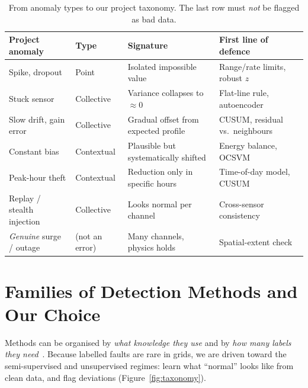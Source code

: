 \documentclass[11pt,a4paper]{article}
\begin{document}
\begin{table}[H]
\centering
\small
\begin{tabularx}{\textwidth}{@{}>{\raggedright\arraybackslash}p{3.1cm}>{\raggedright\arraybackslash}p{2.3cm}LL@{}}
\toprule
\textbf{Project anomaly} & \textbf{Type~\cite{chandola}} & \textbf{Signature} & \textbf{First line of defence} \\
\midrule
Spike, dropout & Point & Isolated impossible value & Range/rate limits, robust $z$ \\
Stuck sensor & Collective & Variance collapses to $\approx 0$ & Flat-line rule, autoencoder \\
Slow drift, gain error & Collective & Gradual offset from expected profile & CUSUM, residual vs.\ neighbours \\
Constant bias & Contextual & Plausible but systematically shifted & Energy balance, OCSVM \\
Peak-hour theft & Contextual & Reduction only in specific hours & Time-of-day model, CUSUM \\
Replay / stealth injection & Collective & Looks normal per channel & Cross-sensor consistency~\cite{fdi} \\
\midrule
\emph{Genuine} surge / outage & (not an error) & Many channels, physics holds & Spatial-extent check \\
\bottomrule
\end{tabularx}
\caption{From anomaly types to our project taxonomy. The last row must \emph{not} be flagged as bad data.}
\label{tab:taxonomy}
\end{table}

\section{Families of Detection Methods and Our Choice}
\label{sec:families}
Methods can be organised by \emph{what knowledge they use} and by \emph{how many labels they
need}~\cite{chandola,pang}. Because labelled faults are rare in grids, we are driven toward the
semi-supervised and unsupervised regimes: learn what ``normal'' looks like from clean data, and flag
deviations (Figure~\ref{fig:taxonomy}).
\end{document}
